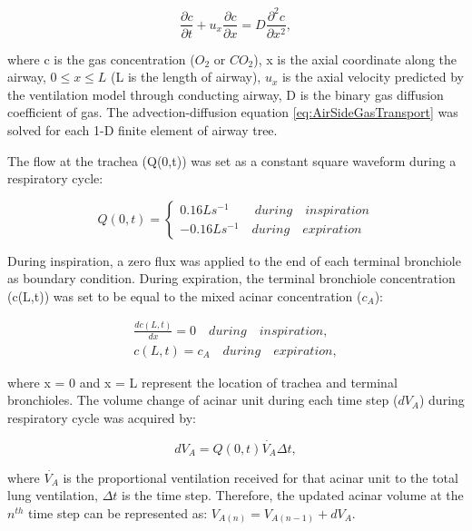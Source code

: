 \begin{equation} 
 \label{eq:AirSideGasTransport}
 \frac{\partial c}{\partial t} + u_x \frac{\partial c}{\partial x} = D \frac{\partial^2c}{\partial x^2},
\end{equation}

\noindent where c is the gas concentration ($O_2$ or $CO_2$), x is the axial coordinate along the airway, $0 \leq x \leq L$ (L is the length of airway), $u_x$ is the axial velocity predicted by the ventilation model through conducting airway, D is the binary gas diffusion coefficient of gas. The advection-diffusion equation \ref{eq:AirSideGasTransport} was solved for each 1-D finite element of airway tree.

The flow at the trachea (Q(0,t)) was set as a constant square waveform during a respiratory cycle:

\begin{equation} 
 \label{eq:TracheaFlow}
 Q(0,t) = \begin{cases}
 0.16Ls^{-1} \quad\quad during \quad inspiration\\
 -0.16Ls^{-1} \quad during \quad expiration
 \end{cases}
\end{equation}

During inspiration, a zero flux was applied to the end of each terminal bronchiole as boundary condition. During expiration, the terminal bronchiole concentration (c(L,t)) was set to be equal to the mixed acinar concentration ($c_A$):

\begin{equation} 
 \label{eq:TerminalBoundaryCondition}
 \begin{split}
 \frac{dc(L,t)}{dx} = 0 \quad during \quad inspiration, \\
 c(L,t) = c_A \quad during \quad expiration,
 \end{split}
\end{equation}

\noindent where x = 0 and x = L represent the location of trachea and terminal bronchioles. The volume change of acinar unit during each time step ($dV_A$) during respiratory cycle was acquired by:

\begin{equation} 
 \label{eq:StepAcinarVolumeChange}
 dV_A = Q(0,t)\dot{V_A}\Delta t,
\end{equation}

\noindent where $\dot{V_A}$ is the proportional ventilation received for that acinar unit to the total lung ventilation, $\Delta t$ is the time step. Therefore, the updated acinar volume at the $n^{th}$ time step can be represented as: $V_{A(n)} = V_{A(n-1)} + dV_A$.


